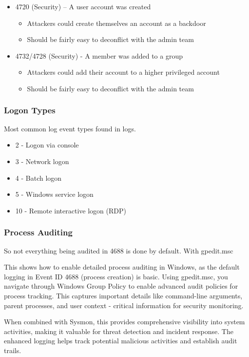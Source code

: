 \begin{itemize}
  \item 4720 (Security) – A user account was created
  \begin{itemize}
    \item Attackers could create themselves an account as a backdoor
    \item Should be fairly easy to deconflict with the admin team
  \end{itemize}
  \item 4732/4728 (Security) - A member was added to a group
  \begin{itemize}
    \item Attackers could add their account to a higher privileged account
    \item Should be fairly easy to deconflict with the admin team
  \end{itemize}
\end{itemize}

\subsubsection*{Logon Types}
Most common log event types found in logs.

\begin{itemize}
  \item 2 - Logon via console
  \item 3 - Network logon
  \item 4 - Batch logon
  \item 5 - Windows service logon
  \item 10 - Remote interactive logon (RDP)
\end{itemize}

\subsubsection*{Process Auditing}
So not everything being audited in 4688 is done by default. With gpedit.msc

This shows how to enable detailed process auditing in Windows, as the default logging in Event ID 4688 (process creation) is basic. Using gpedit.msc, you navigate through Windows Group Policy to enable advanced audit policies for process tracking. This captures important details like command-line arguments, parent processes, and user context - critical information for security monitoring.

When combined with Sysmon, this provides comprehensive visibility into system activities, making it valuable for threat detection and incident response. The enhanced logging helps track potential malicious activities and establish audit trails.

